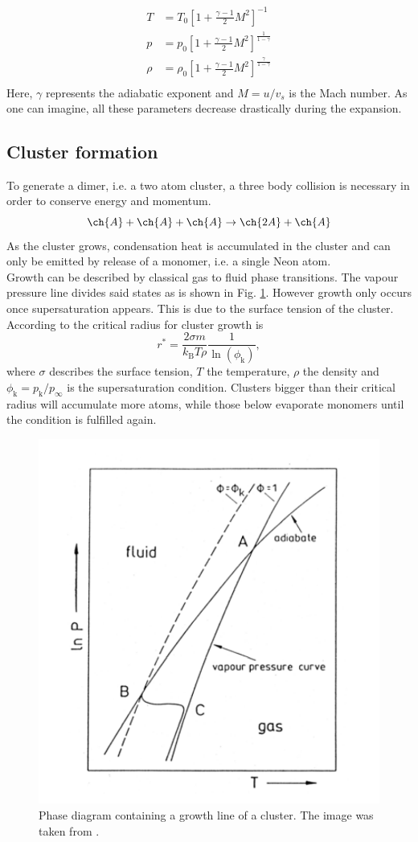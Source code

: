 \documentclass[a4paper,10pt]{article}
\begin{document}
\begin{equation}
	\begin{split}
	T &= T_0 \left[1 + \frac{\gamma - 1}{2} M^2 \right]^{-1} \\
	p &= p_0 \left[1 + \frac{\gamma - 1}{2} M^2 \right]^{\frac{1}{1 - \gamma}} \\
	\rho &= \rho_0 \left[1 + \frac{\gamma - 1}{2} M^2 \right]^{\frac{\gamma}{1-\gamma}} \\
	\end{split}
\end{equation}
Here, $\gamma$ represents the adiabatic exponent and $M = u/v_s$ is the Mach number. As one can imagine, all these parameters decrease drastically during the expansion.

\subsection{Cluster formation}
To generate a dimer, i.e. a two atom cluster, a three body collision is necessary in order to conserve energy and momentum.
\begin{equation}
	\ch{A} + \ch{A} + \ch{A} \rightarrow \ch{2 A} + \ch{A}
\end{equation}
As the cluster grows, condensation heat is accumulated in the cluster and can only be emitted by release of a monomer, i.e. a single Neon atom. \\
Growth can be described by classical gas to fluid phase transitions. The vapour pressure line divides said states as is shown in Fig. \ref{fig_formation}. However growth only occurs once supersaturation appears. This is due to the surface tension of the cluster. According to \cite{script} the critical radius for cluster growth is
\begin{equation}
	r^\ast = \frac{2 \sigma m}{k_\mathrm{B} T \rho} \frac{1}{\ln(\phi_\mathrm{k})},
\end{equation}
where $\sigma$ describes the surface tension, $T$ the temperature, $\rho$ the density and $\phi_\mathrm{k} = p_\mathrm{k} / p_\infty$ is the supersaturation condition. Clusters bigger than their critical radius will accumulate more atoms, while those below evaporate monomers until the condition is fulfilled again.
\begin{figure}
	\centering
	\includegraphics[width = 0.5 \textwidth]{formation.png}
	\caption{Phase diagram containing a growth line of a cluster. The image was taken from \cite{script}. }
	\label{fig_formation}
\end{figure}
\end{document}
